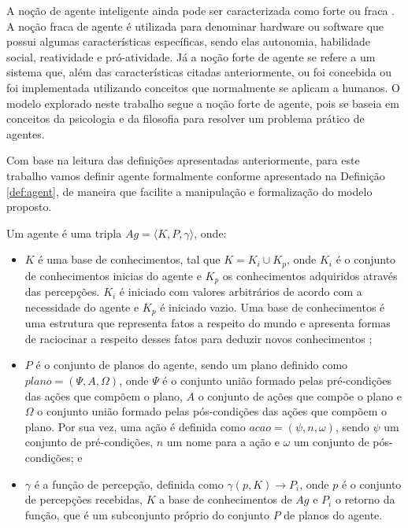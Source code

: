 A noção de agente inteligente ainda pode ser caracterizada como forte ou fraca \cite{wooldridge1995intelligent}. A noção fraca de agente é utilizada para denominar hardware ou software que possui algumas características específicas, sendo elas autonomia, habilidade social, reatividade e pró-atividade. Já a noção forte de agente se refere a um sistema que, além das características citadas anteriormente, ou foi concebida ou foi implementada utilizando conceitos que normalmente se aplicam a humanos. O modelo explorado neste trabalho segue a noção forte de agente, pois se baseia em conceitos da psicologia e da filosofia para resolver um problema prático de agentes.

Com base na leitura das definições apresentadas anteriormente, para este trabalho vamos definir agente formalmente conforme apresentado na Definição \ref{def:agent}, de maneira que facilite a manipulação e formalização do modelo proposto.

\theoremstyle{definition}
\begin{definition}
    \label{def:agent}
    Um agente é uma tripla $Ag = \langle K, P, \gamma \rangle$, onde:
    \begin{itemize}
        \item $K$ é uma base de conhecimentos, tal que $K = K_i \cup K_p$, onde $K_i$ é o conjunto de conhecimentos inicias do agente e $K_p$ os conhecimentos adquiridos através das percepções. $K_i$ é iniciado com valores arbitrários de acordo com a necessidade do agente e $K_p$ é iniciado vazio. Uma base de conhecimentos é uma estrutura que representa fatos a respeito do mundo e apresenta formas de raciocinar a respeito desses fatos para deduzir novos conhecimentos \cite{hayes1983building};
        \item $P$ é o conjunto de planos do agente, sendo um plano definido como $plano = (\Psi, A, \Omega)$, onde $\Psi$ é o conjunto união formado pelas pré-condições das ações que compõem o plano, $A$ o conjunto de ações que compõe o plano e $\Omega$ o conjunto união formado pelas pós-condições das ações que compõem o plano. Por sua vez, uma ação é definida como $acao = (\psi, n, \omega)$, sendo $\psi$ um conjunto de pré-condições, $n$ um nome para a ação e $\omega$ um conjunto de pós-condições; e
        \item $\gamma$ é a função de percepção, definida como $ \gamma(p, K) \rightarrow P_i $, onde $p$ é o conjunto de percepções recebidas, $K$ a base de conhecimentos de $Ag$ e $P_i$ o retorno da função, que é um subconjunto próprio do conjunto $P$ de planos do agente.
    \end{itemize}{}
\end{definition}{}

